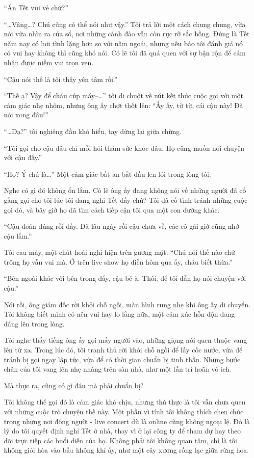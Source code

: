 \documentclass[../main.tex]{subfiles}
\begin{document}
``Ăn Tết vui vẻ chứ?''

``\dots Vâng\dots? Chú cũng có thể nói như vậy.'' Tôi trả lời một cách chung chung, vừa nói vừa nhìn ra cửa sổ, nơi những cành đào vẫn còn rực rỡ sắc hồng. Đúng là Tết năm nay có hơi tĩnh lặng hơn so với năm ngoái, nhưng nếu bảo tôi đánh giá nó có vui hay không thì cũng khó nói. Có lẽ tôi đã quá quen với sự bận rộn để cảm nhận được niềm vui trọn vẹn.

``Cậu nói thế là tôi thấy yên tâm rồi.''

``Thế ạ? Vậy để cháu cúp máy--\dots'' tôi di chuột về nút kết thúc cuộc gọi với một cảm giác nhẹ nhõm, nhưng ông ấy chợt thốt lên: ``Ấy ấy, từ từ, cái cậu này! Đã nói xong đâu!''

``\dots Dạ?'' tôi nghiêng đầu khó hiểu, tay dừng lại giữa chừng.

``Tôi gọi cho cậu đâu chỉ mỗi hỏi thăm sức khỏe đâu. Họ cũng muốn nói chuyện với cậu đấy.''

``Họ? Ý chú là\dots'' Một cảm giác bất an bắt đầu len lỏi trong lòng tôi.

Nghe có gì đó không ổn lắm. Có lẽ ông ấy đang không nói về những người đã cố gắng gọi cho tôi lúc tôi đang nghỉ Tết đấy chứ? Tôi đã cố tình tránh những cuộc gọi đó, và bây giờ họ đã tìm cách tiếp cận tôi qua một con đường khác.

``Cậu đoán đúng rồi đấy. Đã lâu ngày rồi cậu chưa về, các cô gái giờ cũng nhớ cậu lắm.''

Tôi cau mày, một chút hoài nghi hiện trên gương mặt: ``Chú nói thế nào chứ trông họ vẫn vui mà. Ở trên live show họ diễn hôm qua ấy, cháu biết thừa.''

``Bên ngoài khác với bên trong đấy, cậu bé à. Thôi, để tôi dẫn họ nói chuyện với cậu.''

Nói rồi, ông giám đốc rời khỏi chỗ ngồi, màn hình rung nhẹ khi ông ấy di chuyển. Tôi không biết mình có nên vui hay lo lắng nữa, một cảm xúc hỗn độn đang dâng lên trong lòng.

Tôi nghe thấy tiếng ông ấy gọi mấy người vào, những giọng nói quen thuộc vang lên từ xa. Trong lúc đó, tôi tranh thủ rời khỏi chỗ ngồi để lấy cốc nước, vừa để tránh bị gọi ngay lập tức, vừa để có thời gian chuẩn bị tinh thần. Những bước chân của tôi vang lên nhẹ nhàng trên sàn nhà, như một lần trì hoãn vô ích.

Mà thực ra, cũng có gì đâu mà phải chuẩn bị?

Tôi không thể gọi đó là cảm giác khó chịu, nhưng thú thực là tôi vẫn chưa quen với những cuộc trò chuyện thế này. Một phần vì tính tôi không thích chen chúc trong những nơi đông người - live concert dù là online cũng không ngoại lệ. Đó là lý do tôi quyết định nghỉ Tết ở nhà, thay vì ở lại công ty để tham dự hay theo dõi trực tiếp các buổi diễn của họ. Không phải tôi không quan tâm, chỉ là tôi không giỏi hòa vào bầu không khí ấy, như một cây xương rồng lạc giữa rừng hoa.
\end{document}
